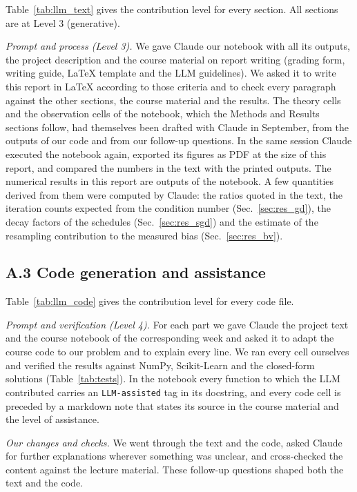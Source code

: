 \documentclass[aps,reprint,amsmath,amssymb,nofootinbib,floatfix]{revtex4-2}
\begin{document}
Table~\ref{tab:llm_text} gives the contribution level for every section. All sections are at
Level 3 (generative).

\emph{Prompt and process (Level 3).} We gave Claude our notebook with all its outputs, the
project description and the course material on report writing (grading form, writing guide,
\LaTeX{} template and the LLM guidelines). We asked it to write this report in \LaTeX{} according
to those criteria and to check every paragraph against the other sections, the course material and
the results. The theory cells and the observation cells of the notebook, which the Methods and
Results sections follow, had themselves been drafted with Claude in September, from the outputs of
our code and from our follow-up questions. In the same session Claude executed the notebook again,
exported its figures as PDF at the size of this report, and compared the numbers in the text with
the printed outputs. The numerical results in this report are outputs of the notebook. A few
quantities derived from them were computed by Claude: the ratios quoted in the text, the iteration
counts expected from the condition number (Sec.~\ref{sec:res_gd}), the decay factors of the
schedules (Sec.~\ref{sec:res_sgd}) and the estimate of the resampling contribution to the measured
bias (Sec.~\ref{sec:res_bv}).

\subsection*{A.3 Code generation and assistance}

Table~\ref{tab:llm_code} gives the contribution level for every code file.

\emph{Prompt and verification (Level 4).} For each part we gave Claude the project text and the
course notebook of the corresponding week and asked it to adapt the course code to our problem and
to explain every line. We ran every cell ourselves and verified the results against NumPy,
Scikit-Learn and the closed-form solutions (Table~\ref{tab:tests}). In the notebook every function
to which the LLM contributed carries an \texttt{LLM-assisted} tag in its docstring, and every code
cell is preceded by a markdown note that states its source in the course material and the level of
assistance.

\emph{Our changes and checks.} We went through the text and the code, asked Claude for further
explanations wherever something was unclear, and cross-checked the content against the lecture
material. These follow-up questions shaped both the text and the code.


\end{document}
